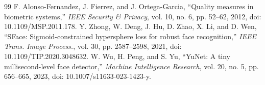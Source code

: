 \documentclass[10pt,lettersize,journal]{IEEEtran}
\begin{document}
\begin{thebibliography}{99}
 F. Alonso-Fernandez, J. Fierrez, and J. Ortega-Garcia, ``Quality measures in biometric systems,'' \textit{IEEE Security \& Privacy}, vol. 10, no. 6, pp. 52--62, 2012, doi: 10.1109/MSP.2011.178.
 Y. Zhong, W. Deng, J. Hu, D. Zhao, X. Li, and D. Wen, ``SFace: Sigmoid-constrained hypersphere loss for robust face recognition,'' \textit{IEEE Trans. Image Process.}, vol. 30, pp. 2587--2598, 2021, doi: 10.1109/TIP.2020.3048632.
 W. Wu, H. Peng, and S. Yu, ``YuNet: A tiny millisecond-level face detector,'' \textit{Machine Intelligence Research}, vol. 20, no. 5, pp. 656--665, 2023, doi: 10.1007/s11633-023-1423-y.
\end{thebibliography}
\end{document}

